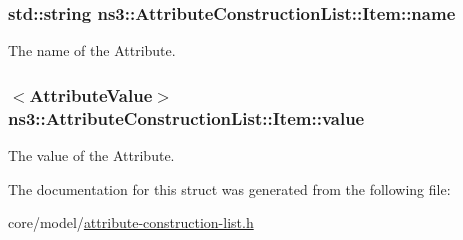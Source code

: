 \subsubsection[{\texorpdfstring{name}{name}}]{\setlength{\rightskip}{0pt plus 5cm}std\+::string ns3\+::\+Attribute\+Construction\+List\+::\+Item\+::name}\hypertarget{structns3_1_1AttributeConstructionList_1_1Item_a0261fa7e7ec744cdb44fc9ba71128483}{}\label{structns3_1_1AttributeConstructionList_1_1Item_a0261fa7e7ec744cdb44fc9ba71128483}
The name of the Attribute. 
\subsubsection[{\texorpdfstring{value}{value}}]{$<${\bf Attribute\+Value}$>$ ns3\+::\+Attribute\+Construction\+List\+::\+Item\+::value}\hypertarget{structns3_1_1AttributeConstructionList_1_1Item_ab437777eee8a81403a76c8ef80654e83}{}\label{structns3_1_1AttributeConstructionList_1_1Item_ab437777eee8a81403a76c8ef80654e83}
The value of the Attribute. 

The documentation for this struct was generated from the following file\+:\begin{DoxyCompactItemize}
\item 
core/model/\hyperlink{attribute-construction-list_8h}{attribute-\/construction-\/list.\+h}\end{DoxyCompactItemize}
